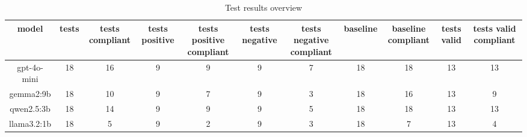 
  \begin{table}[h!]
  \centering
  \begin{tabular}{|c|c|c|c|c|c|c|c|c|c|c|}
  \hline
  model & tests & tests compliant & tests positive & tests positive compliant & tests negative & tests negative compliant & baseline & baseline compliant & tests valid & tests valid compliant \\
  \hline
  gpt-4o-mini & 18 & 16 & 9 & 9 & 9 & 7 & 18 & 18 & 13 & 13\\
\hline
gemma2:9b & 18 & 10 & 9 & 7 & 9 & 3 & 18 & 16 & 13 & 9\\
\hline
qwen2.5:3b & 18 & 14 & 9 & 9 & 9 & 5 & 18 & 18 & 13 & 13\\
\hline
llama3.2:1b & 18 & 5 & 9 & 2 & 9 & 3 & 18 & 7 & 13 & 4
  \end{tabular}
  \caption{Test results overview}
  
  \end{table}
  